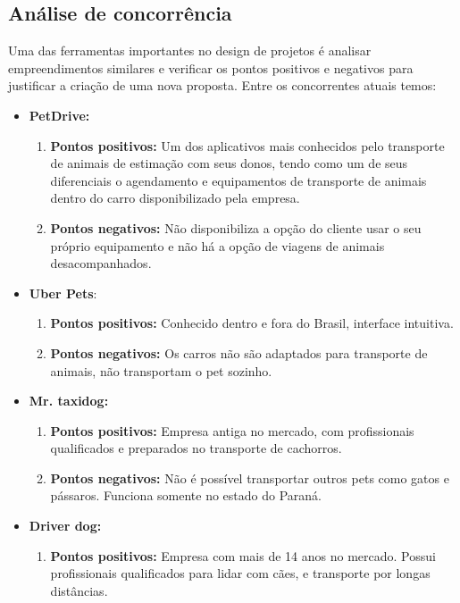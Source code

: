 \subsection{Análise de concorrência}
Uma das ferramentas importantes no design de projetos é analisar empreendimentos similares e verificar os pontos positivos e negativos para justificar a criação de uma nova proposta. Entre os concorrentes atuais temos:
\begin{itemize}
    \item \textbf{PetDrive:}
        \begin{enumerate}
            \item \textbf{Pontos positivos:}
            Um dos aplicativos mais conhecidos pelo transporte de animais de estimação com seus donos, tendo como um de seus diferenciais o agendamento e equipamentos de transporte de animais dentro do carro disponibilizado pela empresa.
            \item \textbf{Pontos negativos:}
            Não disponibiliza a opção do cliente usar o seu próprio equipamento e não há a opção de viagens de animais desacompanhados.
    \end{enumerate}
    \item \textbf{Uber Pets}:
    \begin{enumerate}
            \item \textbf{Pontos positivos:}
            Conhecido dentro e fora do Brasil, interface intuitiva.
            \item \textbf{Pontos negativos:}
            Os carros não são adaptados para transporte de animais, não transportam o pet sozinho.
    \end{enumerate}
    \item \textbf{Mr. taxidog:}
    \begin{enumerate}
            \item \textbf{Pontos positivos:}
            Empresa antiga  no mercado, com profissionais qualificados e preparados no transporte de cachorros.
            \item \textbf{Pontos negativos:}
            Não é possível transportar outros pets como gatos e pássaros. Funciona somente no estado do Paraná.
    \end{enumerate}
    \item \textbf{Driver dog:}
    \begin{enumerate}
            \item \textbf{Pontos positivos:}
            Empresa com mais de 14 anos no mercado. Possui profissionais qualificados para lidar com cães, e transporte por longas distâncias.

\end{enumerate}
\end{itemize}
